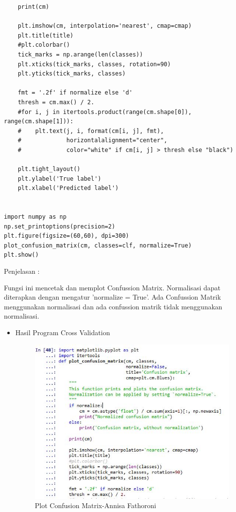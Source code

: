 \begin{enumerate}
\begin{verbatim}
    print(cm)

    plt.imshow(cm, interpolation='nearest', cmap=cmap)
    plt.title(title)
    #plt.colorbar()
    tick_marks = np.arange(len(classes))
    plt.xticks(tick_marks, classes, rotation=90)
    plt.yticks(tick_marks, classes)

    fmt = '.2f' if normalize else 'd'
    thresh = cm.max() / 2.
    #for i, j in itertools.product(range(cm.shape[0]), range(cm.shape[1])):
    #    plt.text(j, i, format(cm[i, j], fmt),
    #             horizontalalignment="center",
    #             color="white" if cm[i, j] > thresh else "black")

    plt.tight_layout()
    plt.ylabel('True label')
    plt.xlabel('Predicted label')
    

import numpy as np
np.set_printoptions(precision=2)
plt.figure(figsize=(60,60), dpi=300)
plot_confusion_matrix(cm, classes=clf, normalize=True)
plt.show()
\end{verbatim}

Penjelasan :

Fungsi ini mencetak dan memplot Confussion Matrix. Normalisasi dapat diterapkan dengan mengatur 'normalize = True'. Ada Confussion Matrik menggunakan normalisasi dan ada confussion matrik tidak menggunakan normalisasi.

\begin{itemize}
\item Hasil Program Cross Validation

\begin{figure}[!hbtp]
\centering
\includegraphics[scale=0.6]{figures/Chapter4AnnisaFathoroni32.jpeg}
\caption{Plot Confusion Matrix-Annisa Fathoroni}
\label{Plot Confusion Matrix-Annisa Fathoroni}
\end{figure}


\end{itemize}
\end{enumerate}
